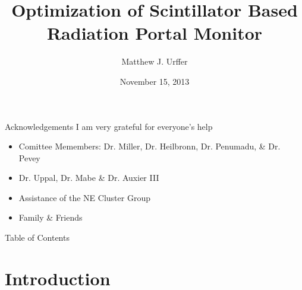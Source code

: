 \documentclass[compress]{beamer}
\title[Dissertation]{Optimization of Scintillator Based Radiation Portal Monitor}
\author[] { Matthew J. Urffer}
\institute[University of Tennessee] {Department of Nuclear Engineering, University of Tennessee, Knoxville, TN}
\date{November 15, 2013}
\begin{document}
\begin{frame}[plain]
  \titlepage
  \tiny
    \begin{center}
  \end{center}
\end{frame}
\begin{frame}{Acknowledgements}
I am very grateful for everyone's help
  \begin{itemize}
    \item Comittee Memembers: Dr. Miller, Dr. Heilbronn, Dr. Penumadu, \& Dr. Pevey
    \item Dr. Uppal, Dr. Mabe \& Dr. Auxier III
    \item Assistance of the NE Cluster Group
    \item Family \& Friends
  \end{itemize}
\end{frame}
\begin{frame}{Table of Contents}
  \label{toc}
  \begin{multicols}{2}
    \tableofcontents
  \end{multicols}
\end{frame}


\section{Introduction}

\end{document}
